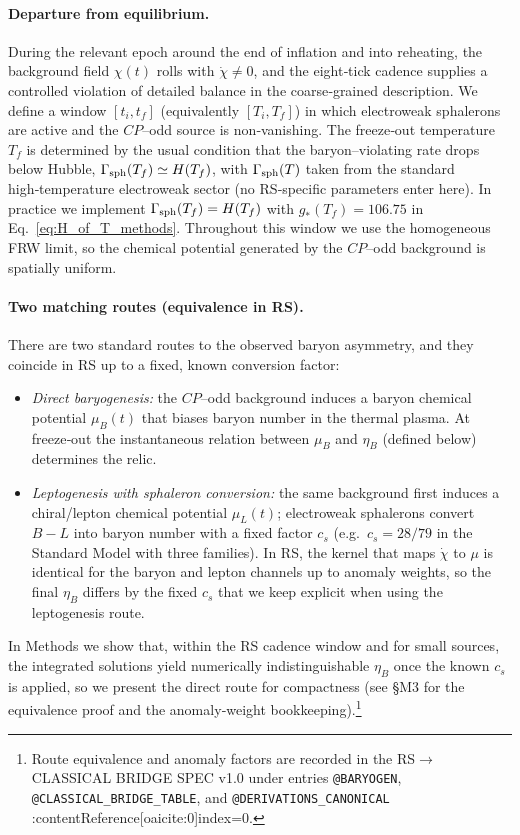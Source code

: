 \documentclass[11pt]{article}
\begin{document}
\paragraph{Departure from equilibrium.}
During the relevant epoch around the end of inflation and into reheating, the background field \(\chi(t)\) rolls with \(\dot\chi\neq 0\), and the eight‑tick cadence supplies a controlled violation of detailed balance in the coarse‑grained description. We define a window \([t_i,t_f]\) (equivalently \([T_i,T_f]\)) in which electroweak sphalerons are active and the \(CP\)–odd source is non‑vanishing. The freeze‑out temperature \(T_f\) is determined by the usual condition that the baryon–violating rate drops below Hubble, \(\Gamma_{\rm sph}(T_f)\simeq H(T_f)\), with \(\Gamma_{\rm sph}(T)\) taken from the standard high‑temperature electroweak sector (no RS‑specific parameters enter here). In practice we implement \(\Gamma_{\rm sph}(T_f)=H(T_f)\) with \(g_*(T_f)=106.75\) in Eq.~\eqref{eq:H_of_T_methods}. Throughout this window we use the homogeneous FRW limit, so the chemical potential generated by the \(CP\)–odd background is spatially uniform.

\paragraph{Two matching routes (equivalence in RS).}
There are two standard routes to the observed baryon asymmetry, and they coincide in RS up to a fixed, known conversion factor:
\begin{itemize}
  \item \emph{Direct baryogenesis:} the \(CP\)–odd background induces a baryon chemical potential \(\mu_B(t)\) that biases baryon number in the thermal plasma. At freeze‑out the instantaneous relation between \(\mu_B\) and \(\eta_B\) (defined below) determines the relic.
  \item \emph{Leptogenesis with sphaleron conversion:} the same background first induces a chiral/lepton chemical potential \(\mu_L(t)\); electroweak sphalerons convert \(B\!-\!L\) into baryon number with a fixed factor \(c_s\) (e.g.\ \(c_s=28/79\) in the Standard Model with three families). In RS, the kernel that maps \(\dot\chi\) to \(\mu\) is identical for the baryon and lepton channels up to anomaly weights, so the final \(\eta_B\) differs by the fixed \(c_s\) that we keep explicit when using the leptogenesis route. 
\end{itemize}
In Methods we show that, within the RS cadence window and for small sources, the integrated solutions yield numerically indistinguishable \(\eta_B\) once the known \(c_s\) is applied, so we present the direct route for compactness (see §M3 for the equivalence proof and the anomaly‑weight bookkeeping).\footnote{Route equivalence and anomaly factors are recorded in the RS\(\to\)CLASSICAL BRIDGE SPEC v1.0 under entries \texttt{@BARYOGEN}, \texttt{@CLASSICAL\_BRIDGE\_TABLE}, and \texttt{@DERIVATIONS\_CANONICAL} :contentReference[oaicite:0]{index=0}.}
\end{document}
